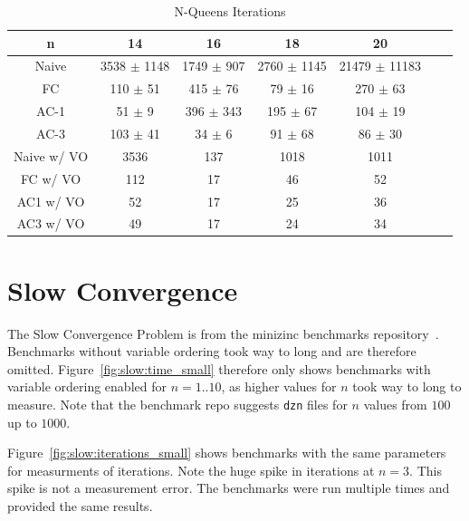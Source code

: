 \begin{table}[h!]
	\centering
	\begin{tabular}{|c|c|c|c|c|c|c|}
		\hline
		n           & 14              & 16             & 18              & 20                \\ \hline
		Naive       & 3538 $\pm$ 1148 & 1749 $\pm$ 907 & 2760 $\pm$ 1145 & 21479 $\pm$ 11183 \\ \hline
		FC          & 110 $\pm$ 51    & 415 $\pm$ 76   & 79 $\pm$ 16     & 270 $\pm$ 63      \\ \hline
		AC-1        & 51 $\pm$ 9      & 396 $\pm$ 343  & 195 $\pm$ 67    & 104 $\pm$ 19      \\ \hline
		AC-3        & 103 $\pm$ 41    & 34 $\pm$ 6     & 91 $\pm$ 68     & 86 $\pm$ 30       \\ \hline
		Naive w/ VO & 3536            & 137            & 1018            & 1011              \\ \hline
		FC w/ VO    & 112             & 17             & 46              & 52                \\ \hline
		AC1 w/ VO   & 52              & 17             & 25              & 36                \\ \hline
		AC3 w/ VO   & 49              & 17             & 24              & 34                \\ \hline
	\end{tabular}
	\caption{N-Queens Iterations}
	\label{tab:queens:iterations}
\end{table}

\section{Slow Convergence}

The Slow Convergence Problem is from the minizinc benchmarks repository~\cite{minizinc_slow:2018}. Benchmarks without variable ordering took way to long and are therefore omitted. Figure~\ref{fig:slow:time_small} therefore only shows benchmarks with variable ordering enabled for $n=1..10$, as higher values for $n$ took way to long to measure. Note that the benchmark repo suggests \verb|dzn| files for $n$ values from $100$ up to $1000$.

Figure~\ref{fig:slow:iterations_small} shows benchmarks with the same parameters for measurments of iterations. Note the huge spike in iterations at $n = 3$. This spike is not a measurement error. The benchmarks were run multiple times and provided the same results.


